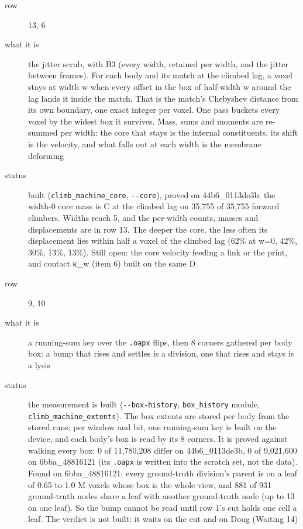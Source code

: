 \begin{description}
\item[{row}] 13, 6
\item[{what it is}] the jitter scrub, with B3 (every width, retained per width, and the jitter between frames). For each body and its match at the climbed lag, a voxel stays at width w when every offset in the box of half-width w around the lag lands it inside the match. That is the match's Chebyshev distance from its own boundary, one exact integer per voxel. One pass buckets every voxel by the widest box it survives. Mass, sums and moments are re-summed per width: the core that stays is the internal constituents, its shift is the velocity, and what falls out at each width is the membrane deforming
\item[{status}] built (\texttt{climb\_\allowbreak{}machine\_\allowbreak{}core}, \texttt{-\allowbreak{}-\allowbreak{}core}), proved on 44b6\_\allowbreak{}0113de3b: the width-0 core mass is C at the climbed lag on 35,755 of 35,755 forward climbers. Widths reach 5, and the per-width counts, masses and displacements are in row 13. The deeper the core, the less often its displacement lies within half a voxel of the climbed lag (62\% at w=0, 42\%, 30\%, 13\%, 13\%). Still open: the core velocity feeding a link or the print, and contact κ\_\allowbreak{}w (item 6) built on the same D
\end{description}

\begin{description}
\item[{row}] 9, 10
\item[{what it is}] a running-sum key over the \texttt{.\allowbreak{}oapx} flips, then 8 corners gathered per body box: a bump that rises and settles is a division, one that rises and stays is a lysis
\item[{status}] the measurement is built (\texttt{-\allowbreak{}-\allowbreak{}box-\allowbreak{}history}, \texttt{box\_\allowbreak{}history} module, \texttt{climb\_\allowbreak{}machine\_\allowbreak{}extents}). The box extents are stored per body from the stored runs; per window and bit, one running-sum key is built on the device, and each body's box is read by its 8 corners. It is proved against walking every box: 0 of 11,780,208 differ on 44b6\_\allowbreak{}0113de3b, 0 of 9,021,600 on 6bba\_\allowbreak{}48816121 (its \texttt{.\allowbreak{}oapx} is written into the scratch set, not the data). Found on 6bba\_\allowbreak{}48816121: every ground-truth division's parent is on a leaf of 0.65 to 1.0 M voxels whose box is the whole view, and 881 of 931 ground-truth nodes share a leaf with another ground-truth node (up to 13 on one leaf). So the bump cannot be read until row 1's cut holds one cell a leaf. The verdict is not built: it waits on the cut and on Doug (Waiting 14)
\end{description}

